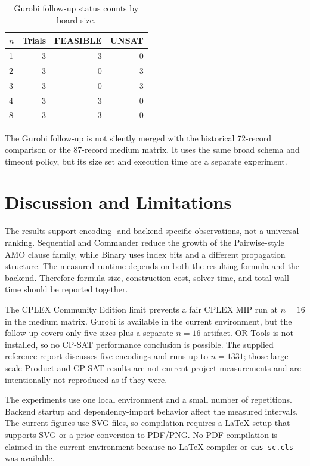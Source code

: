 \documentclass[a4paper,fleqn]{cas-sc}
\begin{document}
\begin{table}[ht]
\centering
\caption{Gurobi follow-up status counts by board size.}
\label{tab:gurobi-followup}
\begin{tabular}{lrrr}
\toprule
$n$ & Trials & FEASIBLE & UNSAT\\
\midrule
1 & 3 & 3 & 0\\
2 & 3 & 0 & 3\\
3 & 3 & 0 & 3\\
4 & 3 & 3 & 0\\
8 & 3 & 3 & 0\\
\bottomrule
\end{tabular}
\end{table}

The Gurobi follow-up is not silently merged with the historical 72-record
comparison or the 87-record medium matrix. It uses the same broad schema and
timeout policy, but its size set and execution time are a separate experiment.

\section{Discussion and Limitations}

The results support encoding- and backend-specific observations, not a
universal ranking. Sequential and Commander reduce the growth of the
Pairwise-style AMO clause family, while Binary uses index bits and a different
propagation structure. The measured runtime depends on both the resulting
formula and the backend. Therefore formula size, construction cost, solver
time, and total wall time should be reported together.

The CPLEX Community Edition limit prevents a fair CPLEX MIP run at $n=16$ in
the medium matrix. Gurobi is available in the current environment, but the
follow-up covers only five sizes plus a separate $n=16$ artifact. OR-Tools is
not installed, so no CP-SAT performance conclusion is possible. The supplied
reference report discusses five encodings and runs up to $n=1331$; those
large-scale Product and CP-SAT results are not current project measurements
and are intentionally not reproduced as if they were.

The experiments use one local environment and a small number of repetitions.
Backend startup and dependency-import behavior affect the measured intervals.
The current figures use SVG files, so compilation requires a LaTeX setup that
supports SVG or a prior conversion to PDF/PNG. No PDF compilation is claimed
in the current environment because no LaTeX compiler or \texttt{cas-sc.cls}
was available.
\end{document}
